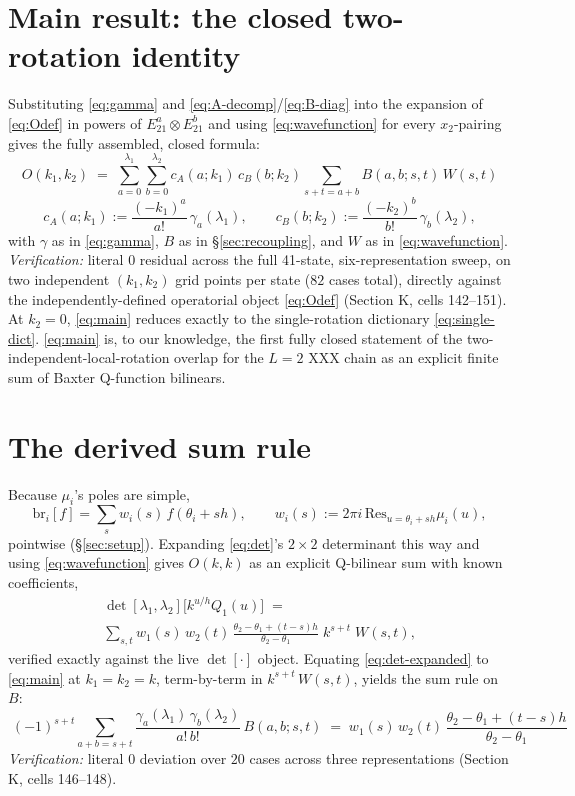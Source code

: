 \documentclass[11pt]{article}
\begin{document}
\section{Main result: the closed two-rotation identity}
\label{sec:main}

Substituting \eqref{eq:gamma} and \eqref{eq:A-decomp}/\eqref{eq:B-diag} into the expansion of
\eqref{eq:Odef} in powers of $E_{21}^a\otimes E_{21}^b$ and using \eqref{eq:wavefunction} for every
$x_2$-pairing gives the fully assembled, closed formula:
\begin{equation}
  \boxed{\;
  O(k_1,k_2) \;=\; \sum_{a=0}^{\lambda_1}\sum_{b=0}^{\lambda_2} c_A(a;k_1)\,c_B(b;k_2)
  \!\!\sum_{s+t=a+b}\!\! B(a,b;s,t)\,W(s,t)\;}
  \label{eq:main}
\end{equation}
\begin{equation}
  c_A(a;k_1) := \frac{(-k_1)^a}{a!}\,\gamma_a(\lambda_1), \qquad
  c_B(b;k_2) := \frac{(-k_2)^b}{b!}\,\gamma_b(\lambda_2),
  \label{eq:cAcB}
\end{equation}
with $\gamma$ as in \eqref{eq:gamma}, $B$ as in \S\ref{sec:recoupling}, and $W$ as in
\eqref{eq:wavefunction}. \emph{Verification:} literal $0$ residual across the full 41-state,
six-representation sweep, on two independent $(k_1,k_2)$ grid points per state ($82$ cases total),
directly against the independently-defined operatorial object \eqref{eq:Odef} (Section K, cells
142--151). At $k_2=0$, \eqref{eq:main} reduces exactly to the single-rotation dictionary
\eqref{eq:single-dict}. \eqref{eq:main} is, to our knowledge, the first fully closed statement of
the two-independent-local-rotation overlap for the $L=2$ XXX chain as an explicit finite sum of
Baxter Q-function bilinears.

\section{The derived sum rule}
\label{sec:sumrule}

Because $\mu_i$'s poles are simple,
\[
  \mathrm{br}_i[f]=\sum_s w_i(s)\,f(\theta_i+sh), \qquad
  w_i(s):=2\pi i\,\mathrm{Res}_{u=\theta_i+sh}\mu_i(u),
\]
pointwise (\S\ref{sec:setup}). Expanding
\eqref{eq:det}'s $2\times2$ determinant this way and using \eqref{eq:wavefunction} gives $O(k,k)$ as
an explicit Q-bilinear sum with known coefficients,
\begin{multline}
  \det[\lambda_1,\lambda_2]\bigl[k^{u/h}Q_1(u)\bigr] \;=\; \\
  \sum_{s,t} w_1(s)\,w_2(t)\,\frac{\theta_2-\theta_1+(t-s)h}{\theta_2-\theta_1}\;
  k^{s+t}\;W(s,t),
  \label{eq:det-expanded}
\end{multline}
verified exactly against the live $\det[\cdot]$ object. Equating \eqref{eq:det-expanded} to
\eqref{eq:main} at $k_1=k_2=k$, term-by-term in $k^{s+t}\,W(s,t)$, yields the sum rule on $B$:
\begin{equation}
  \boxed{\;(-1)^{s+t}\!\!\sum_{a+b=s+t}\!\! \frac{\gamma_a(\lambda_1)\,\gamma_b(\lambda_2)}{a!\,b!}\,
  B(a,b;s,t) \;=\; w_1(s)\,w_2(t)\,\frac{\theta_2-\theta_1+(t-s)h}{\theta_2-\theta_1}\;}
  \label{eq:sumrule}
\end{equation}
\emph{Verification:} literal $0$ deviation over $20$ cases across three representations (Section K,
cells 146--148).
\end{document}
